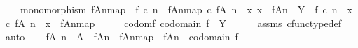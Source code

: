 \begin{isabellebody}
\ \ \ \ monomorphism\ {\isacharparenleft}{\kern0pt}{\isacharbrackleft}{\kern0pt}f{\isasymlparr}A{\isasymrparr}\isactrlbsub n\isactrlesub {\isacharbrackright}{\kern0pt}map{\isacharparenright}{\kern0pt}\ {\isasymand}\ f\ {\isasymcirc}\isactrlsub c\ n\ {\isacharequal}{\kern0pt}\ {\isacharbrackleft}{\kern0pt}f{\isasymlparr}A{\isasymrparr}\isactrlbsub n\isactrlesub {\isacharbrackright}{\kern0pt}map\ {\isasymcirc}\isactrlsub c\ {\isacharparenleft}{\kern0pt}f{\isasymrestriction}\isactrlbsub {\isacharparenleft}{\kern0pt}A{\isacharcomma}{\kern0pt}\ n{\isacharparenright}{\kern0pt}\isactrlesub {\isacharparenright}{\kern0pt}\ {\isasymand}\ {\isacharparenleft}{\kern0pt}{\isasymforall}x{\isachardot}{\kern0pt}\ x\ {\isacharcolon}{\kern0pt}\ f{\isasymlparr}A{\isasymrparr}\isactrlbsub n\isactrlesub \ {\isasymrightarrow}\ Y\ {\isasymlongrightarrow}\ f\ {\isasymcirc}\isactrlsub c\ n\ {\isacharequal}{\kern0pt}\ x\ {\isasymcirc}\isactrlsub c\ {\isacharparenleft}{\kern0pt}f{\isasymrestriction}\isactrlbsub {\isacharparenleft}{\kern0pt}A{\isacharcomma}{\kern0pt}\ n{\isacharparenright}{\kern0pt}\isactrlesub {\isacharparenright}{\kern0pt}\ {\isasymlongrightarrow}\ x\ {\isacharequal}{\kern0pt}\ {\isacharbrackleft}{\kern0pt}f{\isasymlparr}A{\isasymrparr}\isactrlbsub n\isactrlesub {\isacharbrackright}{\kern0pt}map{\isacharparenright}{\kern0pt}{\isachardoublequoteclose}\isanewline
%
\isadelimproof
%
\endisadelimproof
%
\isatagproof
{}\isamarkupfalse%
\ {\isacharminus}{\kern0pt}\isanewline
\ \ \isamarkupfalse%
\ codom{\isacharunderscore}{\kern0pt}f{\isacharcolon}{\kern0pt}\ {\isachardoublequoteopen}codomain\ f\ {\isacharequal}{\kern0pt}\ Y{\isachardoublequoteclose}\isanewline
\ \ \ \ \isamarkupfalse%
\ assms{\isacharparenleft}{\kern0pt}{}{\isacharparenright}{\kern0pt}\ cfunc{\isacharunderscore}{\kern0pt}type{\isacharunderscore}{\kern0pt}def\ \isamarkupfalse%
\ auto\isanewline
\ \ \isamarkupfalse%
\ {\isachardoublequoteopen}f{\isasymrestriction}\isactrlbsub {\isacharparenleft}{\kern0pt}A{\isacharcomma}{\kern0pt}\ n{\isacharparenright}{\kern0pt}\isactrlesub \ {\isacharcolon}{\kern0pt}\ A\ {\isasymrightarrow}\ f{\isasymlparr}A{\isasymrparr}\isactrlbsub n\isactrlesub \ {\isasymand}\ {\isacharparenleft}{\kern0pt}{\isacharbrackleft}{\kern0pt}f{\isasymlparr}A{\isasymrparr}\isactrlbsub n\isactrlesub {\isacharbrackright}{\kern0pt}map{\isacharparenright}{\kern0pt}\ {\isacharcolon}{\kern0pt}\ f{\isasymlparr}A{\isasymrparr}\isactrlbsub n\isactrlesub \ {\isasymrightarrow}\ codomain\ f\ {\isasymand}\isanewline

\end{isabellebody}
